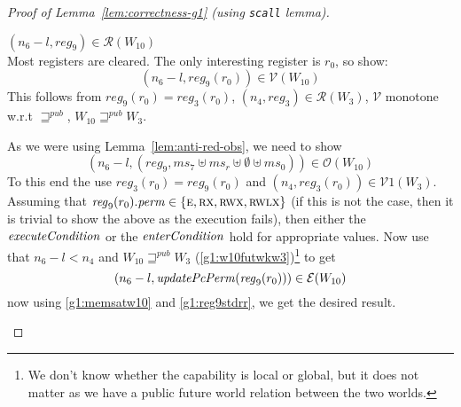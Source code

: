 \documentclass[a4paper]{article}
\newcommand{\var}[1]{\mathit{#1}}
\newcommand{\hs}{\var{ms}}
\newcommand{\ms}{\hs}
\newcommand{\reg}{\var{reg}}
\newcommand{\perm}{\var{perm}}
\newcommand{\plainfun}[2]{
  \ifthenelse{\equal{#2}{}}
  {\mathit{#1}}
  {\mathit{#1}(#2)}
}
\newcommand{\updatePcPerm}[1]{\plainfun{updatePcPerm}{#1}}
\newcommand{\execCond}[1]{\plainfun{executeCondition}{#1}}
\newcommand{\entryCond}[1]{\plainfun{enterCondition}{#1}}
\newcommand{\futurewk}{\mathbin{\sqsupseteq}^{\var{pub}}}
\newcommand{\asmType}{\plaindom{AsmType}}
\newcommand{\plaindom}[1]{\mathrm{#1}}
\newcommand{\intr}[2]{\mathcal{#1}}
\newcommand{\valueintr}[1]{\intr{V}{#1}}
\newcommand{\exprintr}[1]{\intr{E}{#1}}
\newcommand{\regintr}[1]{\intr{R}{#1}}
\newcommand{\stdvr}{\valueintr{\asmType}}
\newcommand{\stder}{\exprintr{\asmType}}
\newcommand{\stdrr}{\regintr{\asmType}}
\newcommand{\observations}{\mathcal{O}}
\newcommand{\npair}[2][n]{\left(#1,#2 \right)}
\newcommand{\plainperm}[1]{\textsc{#1}}
\newcommand{\exec}{\plainperm{rx}}
\newcommand{\entry}{\plainperm{e}}
\newcommand{\rwx}{\plainperm{rwx}}
\newcommand{\rwlx}{\plainperm{rwlx}}
\begin{document}
\begin{proof}[Proof of Lemma~\ref{lem:correctness-g1} (using \texttt{scall} lemma)]
\begin{enumproof}[resume]
\begin{enumproof}
\begin{enumproof}
            \item $\npair[n_6-l]{\reg_9} \in \stdrr(W_{10})$ \label{g1:reg9stdrr}\\
              Most registers are cleared. The only interesting register is $r_0$, so show:
              \[
                \npair[n_6-l]{\reg_9(r_0)}\in \stdvr(W_{10})
              \]
              This follows from $\reg_9(r_0) = \reg_3(r_0)$, $\npair[n_4]{\reg_3} \in \stdrr(W_3)$, $\stdvr$ monotone w.r.t $\futurewk$, $W_{10} \futurewk W_3$.
            \end{enumproof}
            As we were using Lemma~\ref{lem:anti-red-obs}, we need to show
            \[
              \npair[n_6-l]{(reg_9,\ms_7 \uplus \ms_r \uplus \emptyset \uplus \ms_0)} \in \observations(W_{10})
            \]
            To this end the use $\reg_3(r_0) = \reg_9(r_0)$ and $\npair[n_4]{\reg_3(r_0)} \in \stdvr1(W_3)$. Assuming that $\reg_9(r_0).\perm \in \{\entry,\exec,\rwx,\rwlx \}$ (if this is not the case, then it is trivial to show the above as the execution fails), then either the $\execCond{}$ or the $\entryCond{}$ hold for appropriate values. Now use that $n_6-l < n_4$ and $W_{10} \futurewk W_3$ (\ref{g1:w10futwkw3})\footnote{We don't know whether the capability is local or global, but it does not matter as we have a public future world relation between the two worlds.} to get
            \[
              \npair[n_6-l]{\updatePcPerm{\reg_9(r_0)}} \in \stder(W_{10})
            \]
            now using \ref{g1:memsatw10} and \ref{g1:reg9stdrr}, we get the desired result.
        \end{enumproof}
  \end{enumproof}

\end{proof}
\end{document}
